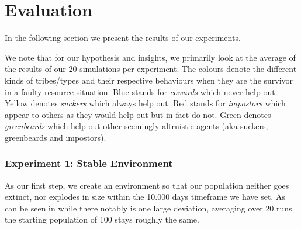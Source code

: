 \documentclass[sigconf]{acmart}
\newcommand{\VNumSimulations}{20\xspace}
\newcommand{\VNumDays}{10.000\xspace}
\newcommand{\cowards}{\textit{cowards}\xspace}
\newcommand{\suckers}{\textit{suckers}\xspace}
\newcommand{\impostors}{\textit{impostors}\xspace}
\newcommand{\greenbeards}{\textit{greenbeards}\xspace}
\begin{document}
    \section{Evaluation}\label{sec:evaluation}

    In the following section we present the results of our experiments.

    We note that for our hypothesis and insights, we primarily look at the average of the results of our \VNumSimulations simulations per experiment.
    The colours denote the different kinds of tribes/types and their respective behaviours when they are the survivor in a faulty-resource situation.
    Blue stands for \cowards which never help out.
    Yellow denotes \suckers which always help out.
    Red stands for \impostors which appear to others as they would help out but in fact do not.
    Green denotes \greenbeards which help out other seemingly altruistic agents (aka suckers, greenbeards and impostors).

    \subsubsection*{Experiment 1: Stable Environment}
    As our first step, we create an environment so that our population neither goes extinct, nor explodes in size within the \VNumDays days timeframe we have set.
    As can be seen in  while there notably is one large deviation, averaging over \VNumSimulations runs the starting population of 100 stays roughly the same.
\end{document}
